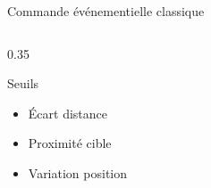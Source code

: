 \begin{frame}{Commande événementielle classique}
\begin{columns}
\begin{column}{0.35\textwidth}
            \begin{block}{Seuils}
                \begin{itemize}
                    \item[$\delta_d$] Écart distance
                    \item[$\delta_c$] Proximité cible
                    \item[$\delta_t$] Variation position
                \end{itemize}
            \end{block}
        \end{column}
    \end{columns}
\end{frame}
